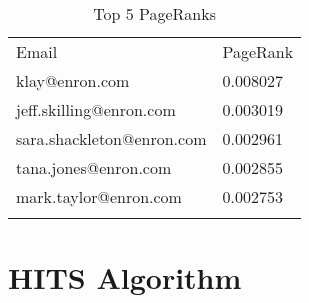 \documentclass{tufte-handout}
\begin{document}
\begin{longtable}[c]{@{}ll@{}}
\toprule\addlinespace
\begin{minipage}[b]{0.37\columnwidth}\raggedright
Email
\end{minipage} & \begin{minipage}[b]{0.14\columnwidth}\raggedright
PageRank
\end{minipage}
\\\addlinespace
\midrule\endhead
\begin{minipage}[t]{0.37\columnwidth}\raggedright
klay@enron.com
\end{minipage} & \begin{minipage}[t]{0.14\columnwidth}\raggedright
0.008027
\end{minipage}
\\\addlinespace
\begin{minipage}[t]{0.37\columnwidth}\raggedright
jeff.skilling@enron.com
\end{minipage} & \begin{minipage}[t]{0.14\columnwidth}\raggedright
0.003019
\end{minipage}
\\\addlinespace
\begin{minipage}[t]{0.37\columnwidth}\raggedright
sara.shackleton@enron.com
\end{minipage} & \begin{minipage}[t]{0.14\columnwidth}\raggedright
0.002961
\end{minipage}
\\\addlinespace
\begin{minipage}[t]{0.37\columnwidth}\raggedright
tana.jones@enron.com
\end{minipage} & \begin{minipage}[t]{0.14\columnwidth}\raggedright
0.002855
\end{minipage}
\\\addlinespace
\begin{minipage}[t]{0.37\columnwidth}\raggedright
mark.taylor@enron.com
\end{minipage} & \begin{minipage}[t]{0.14\columnwidth}\raggedright
0.002753
\end{minipage}
\\\addlinespace
\bottomrule
\addlinespace
\caption{Top 5 PageRanks}
\end{longtable}

\section{HITS Algorithm}\label{hits-algorithm}
\end{document}

